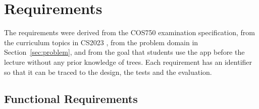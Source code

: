 \section{Requirements}\label{sec:requirements}


The requirements were derived from the COS750 examination specification, from the curriculum topics in CS2023 \cite{Kumar2024}, from the problem domain in Section~\ref{sec:problem}, and from the goal that students use the app before the lecture without any prior knowledge of trees. Each requirement has an identifier so that it can be traced to the design, the tests and the evaluation.

\subsection{Functional Requirements}
